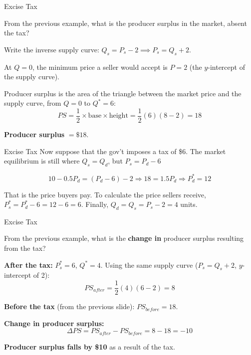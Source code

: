 \documentclass{beamer}
\begin{document}
\begin{frame}{Excise Tax}


  From the previous example, what is the producer surplus in the market, absent the tax?
\end{frame}

\begin{frame}



  \bigskip
  Write the inverse supply curve: $Q_s = P_s - 2 \implies P_s = Q_s + 2$.

  \bigskip
  At $Q=0$, the minimum price a seller would accept is $P=2$ (the $y$-intercept of the supply curve).

  \bigskip
  Producer surplus is the area of the triangle between the market price and the supply curve, from $Q=0$ to $Q^*=6$:
  $$
    PS = \frac{1}{2} \times \text{base} \times \text{height} = \frac{1}{2}(6)(8-2) = 18
  $$

  \bigskip
  \textbf{Producer surplus} $= \$18$.
\end{frame}

\begin{frame}{Excise Tax}
  Now suppose that the gov't imposes a tax of \$6. The market equilibrium is still where $Q_s = Q_d$, but $P_s = P_d - 6$
  
  $$
  10 - 0.5P_d = (P_d - 6) - 2  \Rightarrow 18 = 1.5P_d \Rightarrow P_d^* = 12 
  $$

  \medskip
  That is the price buyers pay. To calculate the price sellers receive, $P_s^* = P_d^* - 6 = 12 - 6 = 6$. Finally, $Q_d = Q_s = P_s - 2 = 4$ units.
\end{frame}

\begin{frame}{Excise Tax}



  From the previous example, what is the \textbf{change in} producer surplus resulting from the tax?
\end{frame}

\begin{frame}



  \bigskip
  \textbf{After the tax:} $P_s^*=6$, $Q^*=4$. Using the same supply curve ($P_s = Q_s+2$, $y$-intercept of 2):
  $$
    PS_{after} = \frac{1}{2}(4)(6-2) = 8
  $$

  \bigskip
  \textbf{Before the tax} (from the previous slide): $PS_{before} = 18$.

  \bigskip
  \textbf{Change in producer surplus:}
  $$
    \Delta PS = PS_{after} - PS_{before} = 8 - 18 = -10
  $$

  \bigskip
  \textbf{Producer surplus falls by \$10} as a result of the tax.
\end{frame}
\end{document}
